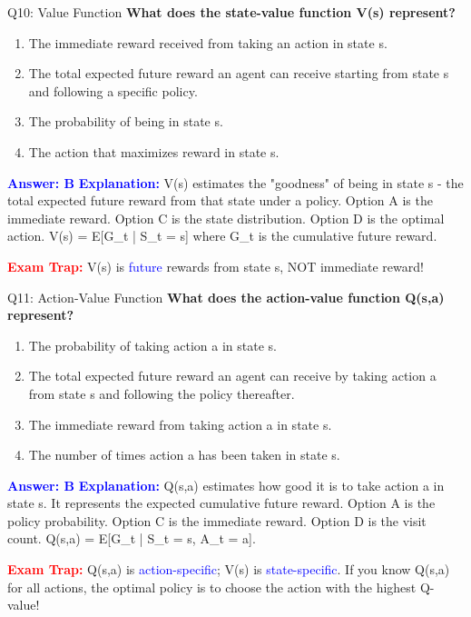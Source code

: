 \documentclass[8pt]{beamer}
\begin{document}
	\begin{frame}{Q10: Value Function}
		\fontsize{6.5}{7.5}\selectfont
		\textbf{What does the state-value function V(s) represent?}
		
		\begin{enumerate}
			\item The immediate reward received from taking an action in state s.
			\item The total expected future reward an agent can receive starting from state s and following a specific policy.
			\item The probability of being in state s.
			\item The action that maximizes reward in state s.
		\end{enumerate}
		
		\vspace{0.1cm}
		\textcolor{blue}{\textbf{Answer: B}}
		\vspace{0.1cm}
		\textcolor{blue}{\textbf{Explanation:}} V(s) estimates the "goodness" of being in state s - the total expected future reward from that state under a policy. Option A is the immediate reward. Option C is the state distribution. Option D is the optimal action. V(s) = E[G\_t | S\_t = s] where G\_t is the cumulative future reward.
		
		\textcolor{red}{\textbf{Exam Trap:}} V(s) is \textcolor{blue}{future} rewards from state s, NOT immediate reward!
	\end{frame}
	
	\begin{frame}{Q11: Action-Value Function}
		\fontsize{6.5}{7.5}\selectfont
		\textbf{What does the action-value function Q(s,a) represent?}
		
		\begin{enumerate}
			\item The probability of taking action a in state s.
			\item The total expected future reward an agent can receive by taking action a from state s and following the policy thereafter.
			\item The immediate reward from taking action a in state s.
			\item The number of times action a has been taken in state s.
		\end{enumerate}
		
		\vspace{0.1cm}
		\textcolor{blue}{\textbf{Answer: B}}
		\vspace{0.1cm}
		\textcolor{blue}{\textbf{Explanation:}} Q(s,a) estimates how good it is to take action a in state s. It represents the expected cumulative future reward. Option A is the policy probability. Option C is the immediate reward. Option D is the visit count. Q(s,a) = E[G\_t | S\_t = s, A\_t = a].
		
		\textcolor{red}{\textbf{Exam Trap:}} Q(s,a) is \textcolor{blue}{action-specific}; V(s) is \textcolor{blue}{state-specific}. If you know Q(s,a) for all actions, the optimal policy is to choose the action with the highest Q-value!
	\end{frame}
	
\end{document}
